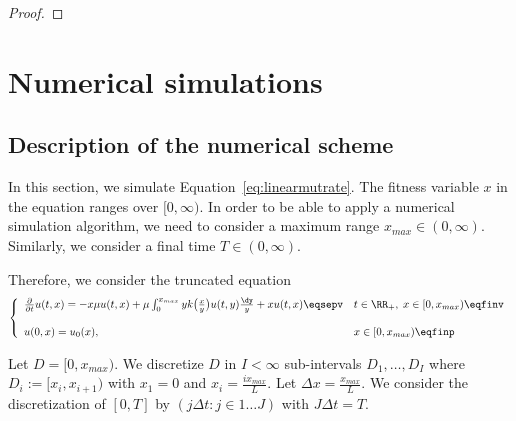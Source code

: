 \begin{proof}
\end{proof}


\section{Numerical simulations}

\subsection{Description of the numerical scheme}

In this section, we simulate Equation~\eqref{eq:linearmutrate}. The fitness variable $x$ in the equation ranges over $[0,\infty)$. In order to be able to apply a numerical simulation algorithm, we need to consider a maximum range $x_{max} \in (0,\infty)$. Similarly, we consider a final time $T \in (0,\infty)$.

Therefore, we consider the truncated equation
\begin{equation}\left\{
    \begin{array}{ll}
	\frac{\partial}{\partial t}u(t,x) = - x\mu u(t,x) + \mu \int_{0}^{x_{max}} y k\big( \frac{x}{y}\big) u(t,y) \frac{\dy}{y} + xu(t,x)
	\eqsepv
	& t \in \RR_+, \; x \in [0,x_{max}) \eqfinv
	\\ \\
	u(0, x) = u_0(x),
	& x \in [0,x_{max})
	\eqfinp
    \end{array}
	\right.
    \label{eq:linearmutratetrunc}
\end{equation}

Let $D = [0, x_{max})$. We discretize $D$ in $I < \infty$ sub-intervals
$D_1, \ldots, D_I$ where $D_i := [x_i, x_{i+1})$ with $x_1 = 0$ and $x_i = \frac{i x_{max}}{L}$. Let $\Delta x = \frac{x_{max}}{L}$. We consider the discretization of $[0,T]$ by $(j\Delta t : j \in 1\ldots J )$ with $J \Delta t = T$.\\ 

